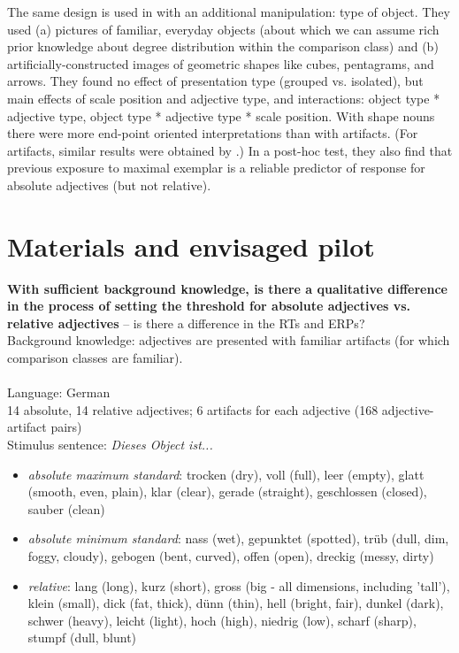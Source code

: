 \documentclass[fleqn,reqno,10pt]{article}
\begin{document}
The same design is used in \citet{LeffelXiangKennedy:2016} with an additional manipulation: type of object. They used (a) pictures of familiar, everyday objects (about which we can assume rich prior knowledge about degree distribution within the comparison class) and (b) artificially-constructed images of geometric shapes like cubes, pentagrams, and arrows. They found no effect of presentation type (grouped vs. isolated), but main effects of scale position and adjective type, and interactions: object type * adjective type, object type * adjective type * scale position. With shape nouns there were more end-point oriented interpretations than with artifacts. (For artifacts, similar results were obtained by \citet{FoppoloPanzieri:2011}.) In a post-hoc test, they also find that previous exposure to maximal exemplar is a reliable predictor of response for absolute adjectives (but not relative).

 

\section{Materials and envisaged pilot}

\textbf{With sufficient background knowledge, is there a qualitative difference in the process of setting the threshold for absolute adjectives vs. relative adjectives}  -- is there a difference in the RTs and ERPs?  \\
Background knowledge: adjectives are presented with familiar artifacts (for which comparison classes are familiar).
\\
\\
Language: German \\
14 absolute, 14 relative adjectives; 6 artifacts for each adjective (168 adjective-artifact pairs)\\
Stimulus sentence: \textit{Dieses Object ist...}
\begin{itemize}
    \item \textit{absolute maximum standard}:
    trocken (dry), voll (full), leer (empty), glatt (smooth, even, plain), klar (clear), gerade (straight), geschlossen (closed), sauber (clean)
    \item \textit{absolute minimum standard}: 
    nass (wet), gepunktet (spotted), trüb (dull, dim, foggy, cloudy), gebogen (bent, curved), offen (open), dreckig (messy, dirty)
    \item \textit{relative}:
    lang (long), kurz (short), gross (big - all dimensions, including 'tall'), klein (small), dick (fat, thick), dünn (thin), hell (bright, fair), dunkel (dark), schwer (heavy), leicht (light), hoch (high), niedrig (low), scharf (sharp), stumpf (dull, blunt)
\end{itemize}
\end{document}

